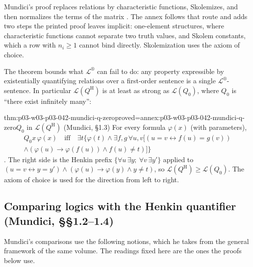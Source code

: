 Mundici's proof replaces relations by characteristic functions,
Skolemizes, and then normalizes the terms of the matrix
\cite[p.~213]{Mundici1985OtherQuantifiers}.  The annex follows that route
and adds two steps the printed proof leaves implicit: one-element
structures, where characteristic functions cannot separate two truth
values, and Skolem constants, which a row with \(n_i\geq1\) cannot bind
directly.  Skolemization uses the axiom of choice.

The theorem bounds what \(\mathscr L^{\circledR}\) can fail to do: any
property expressible by existentially quantifying relations over a
first-order sentence is a single \(\mathscr L^{\circledR}\)-sentence.  In
particular \(\mathscr L(Q^{\mathrm H})\) is at least as strong as
\(\mathscr L(Q_0)\), where \(Q_0\) is ``there exist infinitely many'':

\begin{hbtheorem}{thm:p03-w03-p03-042-mundici-q-zero}{proved=annex:p03-w03-p03-042-mundici-q-zero}{\(Q_0\) in \(\mathscr L(Q^{\mathrm H})\) (Mundici, \S1.3)}
For every formula \(\varphi(x)\) (with parameters),
\begin{multline*}
Q_0x\,\varphi(x)\quad\text{iff}\quad\exists t\{\varphi(t)\wedge\exists f,g\,
\forall u,v[(u=v\leftrightarrow f(u)=g(v))\\
\wedge(\varphi(u)\to\varphi(f(u))\wedge f(u)\neq t)]\}
\end{multline*}
\cite[p.~216]{Mundici1985OtherQuantifiers}.  The right side is the Henkin
prefix \(\{\forall u\,\exists y;\ \forall v\,\exists y'\}\) applied to
\((u=v\leftrightarrow y=y')\wedge(\varphi(u)\to\varphi(y)\wedge y\neq t)\),
so \(\mathscr L(Q^{\mathrm H})\geq\mathscr L(Q_0)\).  The axiom of choice
is used for the direction from left to right.
\end{hbtheorem}

\subsection{Comparing logics with the Henkin quantifier (Mundici, \S\S1.2--1.4)}
\label{sec:p03-w03-p03-042-mundici-compare}

Mundici's comparisons use the following notions, which he takes from the
general framework of the same volume.  The readings fixed here are the
ones the proofs below use.

